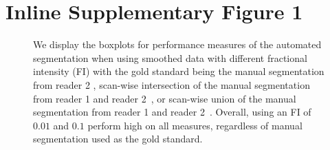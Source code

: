 \section*{Inline Supplementary Figure 1}
\begin{figure}[H]
\hfill
\hfill
\caption[{\bf Comparison of Performance Measures from 2 Manual Brain Segmentations.}]{We display the boxplots for performance measures of the automated segmentation when using smoothed data with different fractional intensity (FI) with the gold standard being the manual segmentation from reader 2 \protect{}, scan-wise intersection of the manual segmentation from reader 1 and reader 2~\protect{}, or scan-wise union of the manual segmentation from reader 1 and reader 2~\protect{}.  Overall, using an FI of $0.01$ and $0.1$ perform high on all measures, regardless of manual segmentation used as the gold standard. }
\label{fig:union_intersect}
\end{figure}

